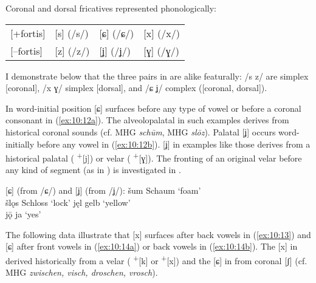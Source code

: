 \ea%
\label{ex:10:11}Coronal and dorsal fricatives represented phonologically:\\
\begin{tabular}{llll}
{[+fortis] }& [s] (/s/) & [ɕ] (/ɕ/) & [x] (/x/)\\
{[--fortis]} & [z] (/z/) & [ʝ] (/ʝ/) & [ɣ] (/ɣ/)\\
\end{tabular}
\z 

I demonstrate below that the three pairs in  are alike featurally: /s z/ are simplex [coronal], /x ɣ/ simplex [dorsal], and /ɕ ʝ/ complex ([coronal, dorsal]).

In word-initial position [ɕ] surfaces before any type of vowel or before a coronal consonant in (\ref{ex:10:12a}). The alveolopalatal in such examples derives from historical coronal sounds (cf. MHG \textit{schūm}, MHG \textit{slōz}). Palatal [ʝ] occurs word-initially before any vowel in (\ref{ex:10:12b}). [ʝ] in examples like those derives from a historical palatal ( \textsuperscript{+}[j]) or velar ( \textsuperscript{+}[ɣ]). The fronting of an original velar before any kind of segment (as in ) is investigated in .

\ea%
\label{ex:10:12} [ɕ] (from /ɕ/) and [ʝ] (from /ʝ/):
\ea\label{ex:10:12a}  šum  \tab [ɕum]  \tab Schaum  \tab ‘foam’   \\
     šlǫs \tab [ɕlɔs] \tab Schloss \tab ‘lock’   
\ex\label{ex:10:12b}  jęl  \tab [ʝɛl]  \tab gelb    \tab ‘yellow’ \\
     jǭ   \tab [ʝɔː]  \tab ja      \tab ‘yes’    
\z 
\z 

The following data illustrate that [x] surfaces after back vowels in (\ref{ex:10:13}) and [ɕ] after front vowels in (\ref{ex:10:14a}) or back vowels in (\ref{ex:10:14b}). The [x] in  derived historically from a velar ( \textsuperscript{+}[k] or \textsuperscript{+}[x]) and the [ɕ] in  from coronal [ʃ] (cf. MHG \textit{zwischen, visch, droschen, vrosch}).


